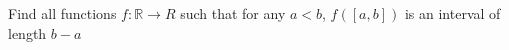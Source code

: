 Find all functions \(f\colon  \mathbb{R}\to{R}\) such that for any \(a<b\), \(f([a,b])\) is an interval of length \(b-a\)